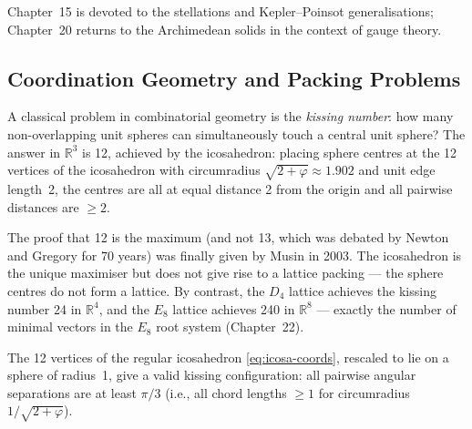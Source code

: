 Chapter~15 is devoted to the stellations and Kepler–Poinsot generalisations;
Chapter~20 returns to the Archimedean solids in the context of gauge theory.

\subsection{Coordination Geometry and Packing Problems}
\label{sec:packing}

A classical problem in combinatorial geometry is the \emph{kissing number}:
how many non-overlapping unit spheres can simultaneously touch a central unit
sphere?  The answer in $\mathbb{R}^3$ is 12, achieved by the icosahedron:
placing sphere centres at the 12 vertices of the icosahedron with circumradius
$\sqrt{2+\varphi} \approx 1.902$ and unit edge length~2, the centres are all
at equal distance 2 from the origin and all pairwise distances are $\geq 2$.

The proof that 12 is the maximum (and not 13, which was debated by Newton and
Gregory for 70 years) was finally given by Musin in 2003.  The icosahedron is
the unique maximiser but does not give rise to a lattice packing — the
sphere centres do not form a lattice.  By contrast, the $D_4$ lattice
achieves the kissing number 24 in $\mathbb{R}^4$, and the $E_8$ lattice
achieves 240 in $\mathbb{R}^8$ — exactly the number of minimal vectors in the
$E_8$ root system (Chapter~22).

\begin{proposition}
\label{prop:kissing}
The 12 vertices of the regular icosahedron \eqref{eq:icosa-coords}, rescaled
to lie on a sphere of radius~1, give a valid kissing configuration: all
pairwise angular separations are at least $\pi/3$ (i.e., all chord lengths
$\geq 1$ for circumradius~$1/\sqrt{2+\varphi}$).
\end{proposition}

